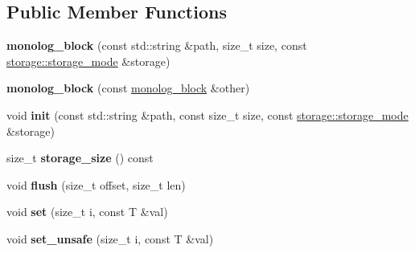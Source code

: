 \subsection*{Public Member Functions}
\begin{DoxyCompactItemize}
\item 
\mbox{\label{classdialog_1_1monolog_1_1monolog__block_a8d913e738c1038d194493afabd5a163a}} 
{\bfseries monolog\+\_\+block} (const std\+::string \&path, size\+\_\+t size, const \hyperlink{structdialog_1_1storage_1_1storage__mode}{storage\+::storage\+\_\+mode} \&storage)
\item 
\mbox{\label{classdialog_1_1monolog_1_1monolog__block_ac62dbe270684c1913ecfbe6c4ffc2106}} 
{\bfseries monolog\+\_\+block} (const \hyperlink{classdialog_1_1monolog_1_1monolog__block}{monolog\+\_\+block} \&other)
\item 
\mbox{\label{classdialog_1_1monolog_1_1monolog__block_a60c7dc093c2168365a13436b1c8232ae}} 
void {\bfseries init} (const std\+::string \&path, const size\+\_\+t size, const \hyperlink{structdialog_1_1storage_1_1storage__mode}{storage\+::storage\+\_\+mode} \&storage)
\item 
\mbox{\label{classdialog_1_1monolog_1_1monolog__block_ae62550c498712643d68cebac4fcc2dbd}} 
size\+\_\+t {\bfseries storage\+\_\+size} () const
\item 
\mbox{\label{classdialog_1_1monolog_1_1monolog__block_a011e51ee79e69a714a54846f4faac934}} 
void {\bfseries flush} (size\+\_\+t offset, size\+\_\+t len)
\item 
\mbox{\label{classdialog_1_1monolog_1_1monolog__block_a848fc37d24b99a125b314ed00d4e9ed3}} 
void {\bfseries set} (size\+\_\+t i, const T \&val)
\item 
\mbox{\label{classdialog_1_1monolog_1_1monolog__block_abd7d20244b68a05ac9f5d9bdf42e0255}} 
void {\bfseries set\+\_\+unsafe} (size\+\_\+t i, const T \&val)
\item 
\mbox{\label{classdialog_1_1monolog_1_1monolog__block_ad5e410b9dde8f44a1960e87beade503c}} 

\end{DoxyCompactItemize}
